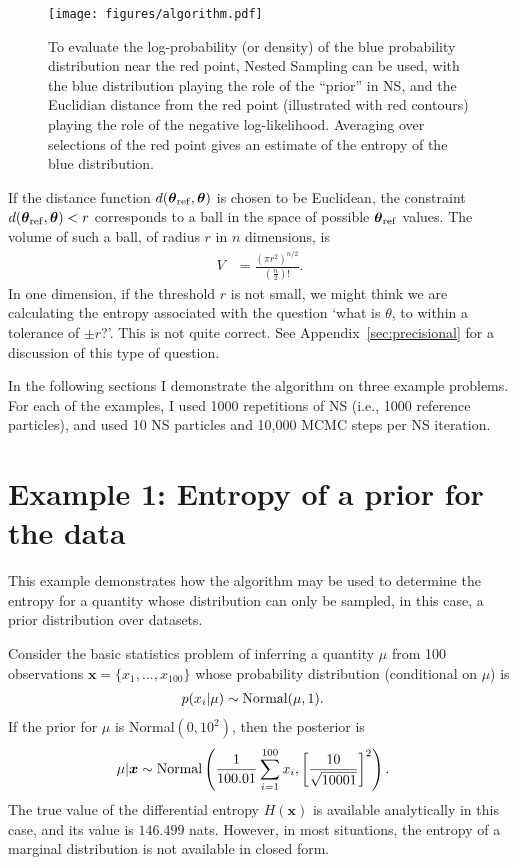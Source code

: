 \documentclass[entropy,article,accept,oneauthor,pdftex,10pt,a4paper]{mdpi}
\newcommand{\revision}{\color{darkblue}}
\newcommand{\x}{\boldsymbol{\theta}}
\newcommand{\xref}{\x_{\rm ref}}
\begin{document}
\begin{figure}[!ht]
\centering
\texttt{[image: figures/algorithm.pdf]}
\caption{To evaluate the log-probability (or density) of the blue
probability distribution {\revision near} the red point, Nested Sampling can be used,
with the blue distribution playing the role of the ``prior'' in NS, and the
Euclidian distance from the red point (illustrated with red contours)
playing the role of the negative log-likelihood. Averaging over selections
of the red point gives an estimate of the entropy of the blue distribution.
\label{fig:algorithm}}
\end{figure}

If the distance function $d(\xref, \x)$ is chosen to be Euclidean,
the constraint $d(\xref, \x) < r$ corresponds to a ball in the space
of possible $\xref$ values.
The volume of such a ball, of radius $r$ in $n$ dimensions, is
{\revision
\begin{align}
V &= \frac{(\pi r^2)^{n/2}}{(\frac{n}{2})!}.
\end{align}}
In one dimension,
if the threshold $r$ is not small, we might think we are calculating the entropy associated
with the question `what is $\theta$, to within a tolerance of $\pm r$?'.
This is not quite correct. See Appendix~\ref{sec:precisional}
for a discussion of this
type of question.

In the following sections I demonstrate the algorithm on three
example problems. For each of the examples, I used 1000 repetitions of NS
(i.e., 1000 reference particles), and used 10 NS particles and 10,000 MCMC
steps per NS iteration.

\section{Example 1: Entropy of a prior for the data}

This example demonstrates how the algorithm may be used to determine the
entropy for a quantity whose distribution can only be sampled, in this case,
a prior distribution over datasets.

Consider the basic statistics problem of inferring a quantity $\mu$ from
100 observations $\boldsymbol{x} = \{x_1, ..., x_{100}\}$ whose
probability distribution (conditional on $\mu$) is
\begin{align}
p(x_i | \mu) &\sim \textnormal{Normal}(\mu, 1).
\end{align}
If the prior for $\mu$ is Normal$(0, 10^2)$, then the posterior is
\begin{align}
\mu | \boldsymbol{x} &\sim \textnormal{Normal}\left(
                                       \frac{1}{100.01}\sum_{i=1}^{100} x_i,
                                       \left[\frac{10}{\sqrt{10001}}\right]^2
                                       \right).
\end{align}
The true value of the differential entropy $H(\boldsymbol{x})$ is
available analytically
in this case, and its value is $146.499$ nats. However, in most situations, the
entropy of a marginal distribution is not available in closed form. 
\end{document}
